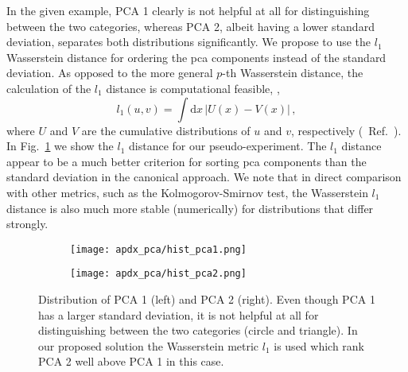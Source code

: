 In the given example, PCA 1 clearly is not helpful at all for distinguishing between the two categories, whereas PCA 2, albeit having a lower standard deviation, separates both distributions significantly.
We propose to use the $l_1$ Wasserstein distance for ordering the \gls{pca} components instead of the standard deviation.
As opposed to the more general $p$-th Wasserstein distance, the calculation of the $l_1$ distance is computational feasible, \ie{},
\begin{equation*}
    l_1(u, v) = \int \! \mathrm{d}x \, |U(x) - V(x)| \,,
\end{equation*}
where $U$ and $V$ are the cumulative distributions of $u$ and $v$, respectively (\cf{}~Ref.~\cite{wassersteinl1equiv}).
In Fig.~\ref{fig:apdx_hpca} we show the $l_1$ distance for our pseudo-experiment.
The $l_1$ distance appear to be a much better criterion for sorting \gls{pca} components than the standard deviation in the canonical approach.
We note that in direct comparison with other metrics, such as the Kolmogorov-Smirnov test, the Wasserstein $l_1$ distance is also much more stable (numerically) for distributions that differ strongly.
\begin{figure}[htbp]
    \centering
    \begin{subfigure}{.49\textwidth}
        \centering
        \texttt{[image: apdx\_pca/hist\_pca1.png]}
    \end{subfigure}
    \begin{subfigure}{.49\textwidth}
        \centering
        \texttt{[image: apdx\_pca/hist\_pca2.png]}
    \end{subfigure}
    \caption{Distribution of PCA 1 (left) and PCA 2 (right). Even though PCA 1 has a larger standard deviation, it is not helpful at all for distinguishing between the two categories (circle and triangle). In our proposed solution the Wasserstein metric $l_1$ is used which rank PCA 2 well above PCA 1 in this case.}
    \label{fig:apdx_hpca}
\end{figure}
